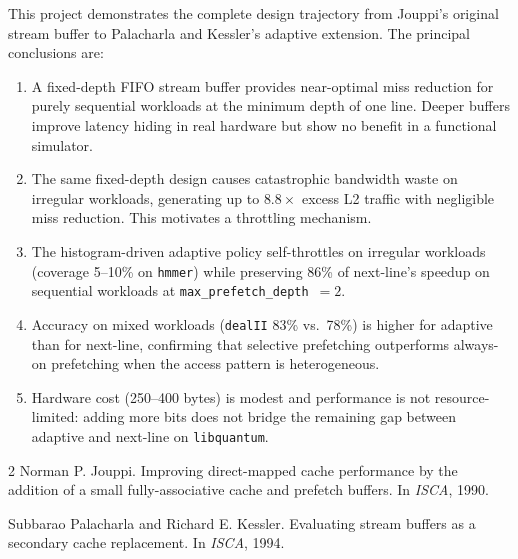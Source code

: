 \documentclass[11pt,letterpaper]{article}
\begin{document}
This project demonstrates the complete design trajectory from Jouppi's original
stream buffer to Palacharla and Kessler's adaptive extension. The principal
conclusions are:

\begin{enumerate}
\item A fixed-depth FIFO stream buffer provides near-optimal miss reduction
      for purely sequential workloads at the minimum depth of one line. Deeper
      buffers improve latency hiding in real hardware but show no benefit in a
      functional simulator.
\item The same fixed-depth design causes catastrophic bandwidth waste on
      irregular workloads, generating up to $8.8\times$ excess L2 traffic with
      negligible miss reduction. This motivates a throttling mechanism.
\item The histogram-driven adaptive policy self-throttles on irregular workloads
      (coverage 5--10\% on \texttt{hmmer}) while preserving 86\% of next-line's
      speedup on sequential workloads at \texttt{max\_prefetch\_depth}~$= 2$.
\item Accuracy on mixed workloads (\texttt{dealII} 83\% vs.\ 78\%) is higher
      for adaptive than for next-line, confirming that selective prefetching
      outperforms always-on prefetching when the access pattern is heterogeneous.
\item Hardware cost (250--400 bytes) is modest and performance is not
      resource-limited: adding more bits does not bridge the remaining gap
      between adaptive and next-line on \texttt{libquantum}.
\end{enumerate}

\begin{thebibliography}{2}
Norman P. Jouppi.
\newblock Improving direct-mapped cache performance by the addition of a small
fully-associative cache and prefetch buffers.
\newblock In \emph{ISCA}, 1990.

Subbarao Palacharla and Richard E. Kessler.
\newblock Evaluating stream buffers as a secondary cache replacement.
\newblock In \emph{ISCA}, 1994.
\end{thebibliography}
\end{document}
